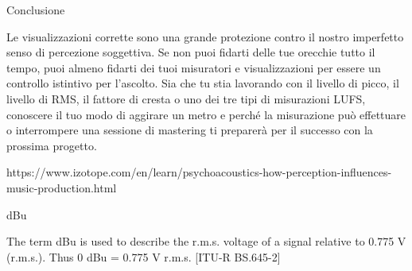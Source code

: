 Conclusione

Le visualizzazioni corrette sono una grande protezione contro il nostro imperfetto
senso di percezione soggettiva. Se non puoi fidarti delle tue orecchie tutto il tempo,
puoi almeno fidarti dei tuoi misuratori e visualizzazioni per essere un controllo
istintivo per l'ascolto. Sia che tu stia lavorando con il livello di picco, il
livello di RMS, il fattore di cresta o uno dei tre tipi di misurazioni LUFS,
conoscere il tuo modo di aggirare un metro e perché la misurazione può effettuare o
interrompere una sessione di mastering ti preparerà per il successo con la prossima progetto.


https://www.izotope.com/en/learn/psychoacoustics-how-perception-influences-music-production.html


dBu

The term dBu is used to describe the r.m.s. voltage of a signal relative to 0.775 V (r.m.s.). Thus 0 dBu = 0.775 V r.m.s. [ITU-R BS.645-2]

